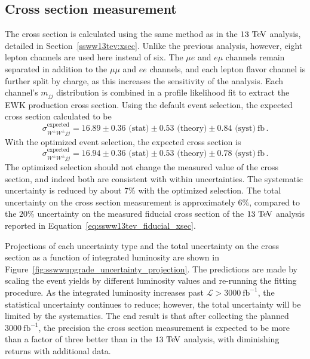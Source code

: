 \subsection{Cross section measurement}\label{sswwupgrade:results_xsec}

The cross section is calculated using the same method as in the $13\tev$ analysis, detailed in Section~\ref{ssww13tev:xsec}.
Unlike the previous analysis, however, eight lepton channels are used here instead of six.
The $\mu e$ and $e\mu$ channels remain separated in addition to the $\mu\mu$ and $ee$ channels, and each lepton flavor channel is further split by charge, as this increases the sensitivity of the analysis.
Each channel's $m_{jj}$ distribution is combined in a profile likelihood fit to extract the EWK \ssww production cross section.
Using the default event selection, the expected cross section calculated to be
\begin{equation}
  \sigma_{W^\pm W^\pm jj}^{\textrm{expected}} = 16.89 \pm 0.36 \textrm{\ (stat)} \pm 0.53 \textrm{\ (theory)} \pm 0.84 \textrm{\ (syst)}~\textrm{fb}\,.
  \label{eq:sswwupgrade_xsec_default}
\end{equation}
With the optimized event selection, the expected cross section is
\begin{equation}
    \sigma_{W^\pm W^\pm jj}^{\textrm{expected}} = 16.94 \pm 0.36 \textrm{\ (stat)} \pm 0.53 \textrm{\ (theory)} \pm 0.78 \textrm{\ (syst)}~\textrm{fb}\,.
  \label{eq:sswwupgrade_xsec_optimized}
\end{equation}
The optimized selection should not change the measured value of the cross section, and indeed both are consistent with within uncertainties.
The systematic uncertainty is reduced by about 7\% with the optimized selection.
The total uncertainty on the cross section measurement is approximately $6\%$, compared to the $20\%$ uncertainty on the measured fiducial cross section of the $13\tev$ analysis reported in Equation~\ref{eq:ssww13tev_fiducial_xsec}.

Projections of each uncertainty type and the total uncertainty on the cross section as a function of integrated luminosity are shown in Figure~\ref{fig:sswwupgrade_uncertainty_projection}.
The predictions are made by scaling the event yields by different luminosity values and re-running the fitting procedure.
As the integrated luminosity increases past $\mathcal{L} > 3000~\textrm{fb}^{-1}$, the statistical uncertainty continues to reduce; however, the total uncertainty will be limited by the systematics.
The end result is that after collecting the planned $3000~\textrm{fb}^{-1}$, the precision the \ssww cross section measurement is expected to be more than a factor of three better than in the $13\tev$ analysis, with diminishing returns with additional data.

